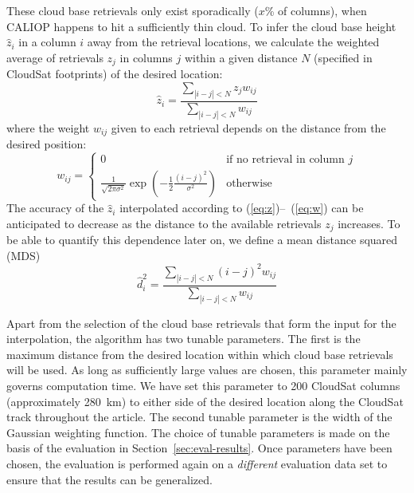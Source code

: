 \documentclass{article}
\begin{document}
These cloud base retrievals only exist sporadically ($x$\% of columns), when
CALIOP happens to hit a sufficiently thin cloud.  To infer the cloud base height
$\hat{z}_i$ in a column $i$ away from the retrieval locations, we calculate the
weighted average of retrievals $z_j$ in columns $j$ within a given distance $N$
(specified in CloudSat footprints) of the desired location:
\begin{equation}
  \label{eq:z}
  \hat{z}_i = \frac{\sum\limits_{|i - j| < N} z_j w_{ij}}
  {\sum\limits_{|i - j| < N} w_{ij}}
\end{equation}
where the weight $w_{ij}$ given to each retrieval depends on the distance from
the desired position:
\begin{equation}
  \label{eq:w}
  w_{ij} = \left\{
    \begin{array}{cl}
      0 & \mbox{if no retrieval in column }j\\
      \frac{1}{\sqrt{2\pi\sigma^2}}\exp\left(-\frac12\frac{(i -
          j)^2}{\sigma^2}\right) & \mbox{otherwise}
    \end{array}\right.
\end{equation}
The accuracy of the $\hat{z}_i$ interpolated according to
(\ref{eq:z})--~(\ref{eq:w}) can be anticipated to decrease as the distance to
the available retrievals $z_j$ increases.  To be able to quantify this
dependence later on, we define a mean distance squared (MDS)
\begin{equation}
  \label{eq:d}
  \hat{d}^2_i = \frac{\sum\limits_{|i - j| < N} (i-j)^2 w_{ij}}
  {\sum\limits_{|i - j| < N} w_{ij}}
\end{equation}

Apart from the selection of the cloud base retrievals that form the input
for the interpolation, the algorithm has two tunable parameters.  The first is
the maximum distance from the desired location within which cloud base
retrievals will be used.  As long as sufficiently large values are chosen, this
parameter mainly governs computation time.  We have set this parameter to 200
CloudSat columns (approximately 280~km) to either side of the desired location
along the CloudSat track throughout the article.  The second tunable parameter
is the width of the Gaussian weighting function.  The choice of tunable
parameters is made on the basis of the evaluation
in Section~\ref{sec:eval-results}.  Once parameters have been chosen, the
evaluation is performed again on a \emph{different} evaluation data set to
ensure that the results can be generalized.
\end{document}
